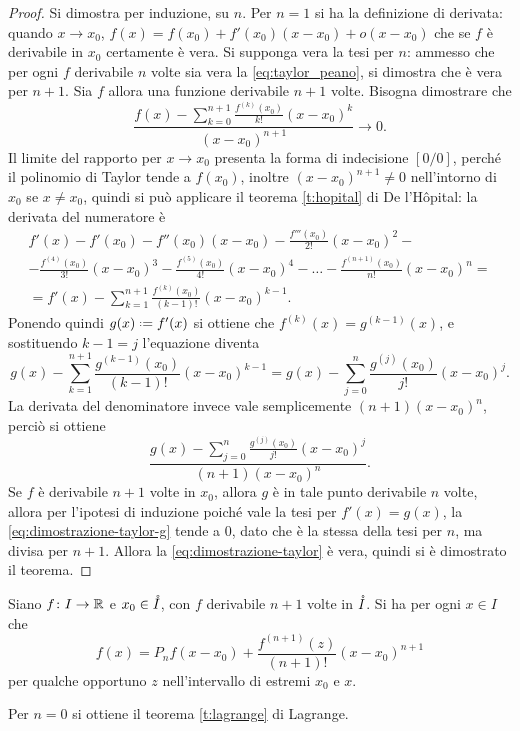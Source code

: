 \begin{proof}
Si dimostra per induzione, su $n$. Per $n=1$ si ha la definizione di derivata: quando $x\to x_0$, $f(x)=f(x_0)+f'(x_0)(x-x_0)+o(x-x_0)$ che se $f$ è derivabile in $x_0$ certamente è vera.
Si supponga vera la tesi per $n$: ammesso che per ogni $f$ derivabile $n$ volte sia vera la \eqref{eq:taylor_peano}, si dimostra che è vera per $n+1$. Sia $f$ allora una funzione derivabile $n+1$ volte. Bisogna dimostrare che
\begin{equation}
\label{eq:dimostrazione-taylor}
\frac{\displaystyle f(x)-\sum_{k=0}^{n+1}\frac{f^{(k)}(x_0)}{k!}(x-x_0)^k}{(x-x_0)^{n+1}}\to 0.
\end{equation}
Il limite del rapporto per $x\to x_0$ presenta la forma di indecisione $[0/0]$, perché il polinomio di Taylor tende a $f(x_0)$, inoltre $(x-x_0)^{n+1}\neq0$ nell'intorno di $x_0$ se $x\neq x_0$, quindi si può applicare il teorema \ref{t:hopital} di De l'H\^opital: la derivata del numeratore è
\begin{multline*}
f'(x)-f'(x_0)-f''(x_0)(x-x_0)-\frac{f'''(x_0)}{2!}(x-x_0)^2-\\
-\frac{f^{(4)}(x_0)}{3!}(x-x_0)^3-\frac{f^{(5)}(x_0)}{4!}(x-x_0)^4-\dots-\frac{f^{(n+1)}(x_0)}{n!}(x-x_0)^n=\\
=f'(x)-\sum_{k=1}^{n+1}\frac{f^{(k)}(x_0)}{(k-1)!}(x-x_0)^{k-1}.
\end{multline*}
Ponendo quindi $g(x)\defeq f'(x)$ si ottiene che $f^{(k)}(x)=g^{(k-1)}(x)$, e sostituendo $k-1=j$ l'equazione diventa
\[
g(x)-\sum_{k=1}^{n+1}\frac{g^{(k-1)}(x_0)}{(k-1)!}(x-x_0)^{k-1}=g(x)-\sum_{j=0}^{n}\frac{g^{(j)}(x_0)}{j!}(x-x_0)^j.
\]
La derivata del denominatore invece vale semplicemente $(n+1)(x-x_0)^n$, perciò si ottiene
\begin{equation}
\label{eq:dimostrazione-taylor-g}
\frac{\displaystyle g(x)-\sum_{j=0}^{n}\frac{g^{(j)}(x_0)}{j!}(x-x_0)^j}{(n+1)(x-x_0)^n}.
\end{equation}
Se $f$ è derivabile $n+1$ volte in $x_0$, allora $g$ è in tale punto derivabile $n$ volte, allora per l'ipotesi di induzione poiché vale la tesi per $f'(x)=g(x)$, la \eqref{eq:dimostrazione-taylor-g} tende a 0, dato che è la stessa della tesi per $n$, ma divisa per $n+1$. Allora la \eqref{eq:dimostrazione-taylor} è vera, quindi si è dimostrato il teorema.
\end{proof}
\begin{teorema}
\label{t:taylor_lagrange}
Siano $f\colon I\to\mathbb{R}$ e $x_0\in\mathring{I}$, con $f$ derivabile $n+1$ volte in $\mathring{I}$. Si ha per ogni $x\in I$ che
\begin{equation}
\label{eq:taylor_lagrange}
f(x)=P_nf(x-x_0)+\frac{f^{(n+1)}(z)}{(n+1)!}(x-x_0)^{n+1}
\end{equation}
per qualche opportuno $z$ nell'intervallo di estremi $x_0$ e $x$.
\end{teorema}
Per $n=0$ si ottiene il teorema \ref{t:lagrange} di Lagrange.

